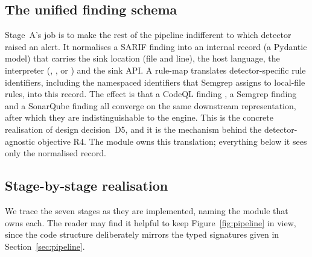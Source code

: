 \subsection{The unified finding schema}
\label{sec:schema}

Stage~A's job is to make the rest of the pipeline indifferent to which
detector raised an alert. It normalises a SARIF finding
\citep{sarif2023} into an internal record (a Pydantic model) that carries the
sink location (file and line), the host language, the interpreter
(, ,  or ) and the sink API. A
rule-map translates detector-specific rule identifiers, including the
namespaced identifiers that Semgrep assigns to local-file rules, into this
record. The effect is that a CodeQL finding \citep{avgustinov2016codeql}, a
Semgrep finding \citep{semgrep2024} and a SonarQube finding all converge on
the same downstream representation, after which they are indistinguishable
to the engine. This is the concrete realisation of design decision~D5, and
it is the mechanism behind the detector-agnostic objective R4. The
 module owns this translation; everything below it sees only
the normalised record.

\subsection{Stage-by-stage realisation}
\label{sec:stages}

We trace the seven stages as they are implemented, naming the module that
owns each. The reader may find it helpful to keep Figure~\ref{fig:pipeline}
in view, since the code structure deliberately mirrors the typed signatures
given in Section~\ref{sec:pipeline}.

